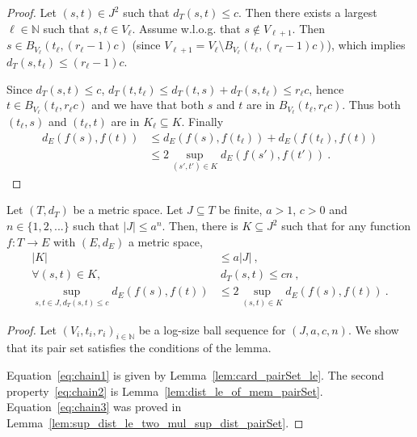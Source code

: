 \begin{proof}
Let $(s, t) \in J^2$ such that $d_T(s, t) \le c$.
Then there exists a largest $\ell \in \mathbb{N}$ such that $s, t \in V_\ell$.
Assume w.l.o.g. that $s \notin V_{\ell + 1}$. Then $s \in B_{V_\ell}(t_\ell, (r_\ell-1)c)$ (since $V_{\ell + 1} = V_\ell \setminus B_{V_\ell}(t_\ell, (r_\ell-1)c)$), which implies $d_T(s, t_\ell) \le (r_\ell - 1)c$.

Since $d_T(s, t) \le c$, $d_T(t, t_\ell) \le d_T(t, s) + d_T(s, t_\ell) \le r_\ell c$, hence $t \in B_{V_\ell}(t_\ell, r_\ell c)$ and we have that both $s$ and $t$ are in $B_{V_\ell}(t_\ell, r_\ell c)$.
Thus both $(t_\ell, s)$ and $(t_\ell, t)$ are in $K_\ell \subseteq K$.
Finally
\begin{align*}
  d_E(f(s), f(t))
  &\le d_E(f(s), f(t_\ell)) + d_E(f(t_\ell), f(t))
  \\
  &\le 2\sup_{(s',t') \in K} d_E(f(s'), f(t'))
  \: .
\end{align*}
\end{proof}


\begin{lemma}\label{lem:pair_reduction}
  \mathlibok
Let $(T,d_T)$ be a metric space.
Let $J \subseteq T$ be finite, $a > 1$, $c>0$ and $n \in \{1, 2, ...\}$ such that $|J| \le a^n$.
Then, there is $K \subseteq J^2$ such that for any function $f : T \to E$ with $(E,d_E)$ a metric space,
\begin{align}
  |K|
  & \le a |J|
  \:, \label{eq:chain1} \\
  \forall (s,t) \in K,
  &\:  d_T(s,t) \le c n
  \:, \label{eq:chain2} \\
  \sup_{s,t\in J, d_T(s,t) \le c} d_E(f(s), f(t))
  & \le 2 \sup_{(s,t) \in K} d_E(f(s), f(t))
  \: . \label{eq:chain3}
\end{align}
\end{lemma}

\begin{proof}  
Let $(V_i, t_i, r_i)_{i \in \mathbb{N}}$ be a log-size ball sequence for $(J, a, c, n)$. We show that its pair set satisfies the conditions of the lemma.

Equation~\eqref{eq:chain1} is given by Lemma~\ref{lem:card_pairSet_le}.
The second property~\eqref{eq:chain2} is Lemma~\ref{lem:dist_le_of_mem_pairSet}.
Equation~\eqref{eq:chain3} was proved in Lemma~\ref{lem:sup_dist_le_two_mul_sup_dist_pairSet}.
\end{proof}





